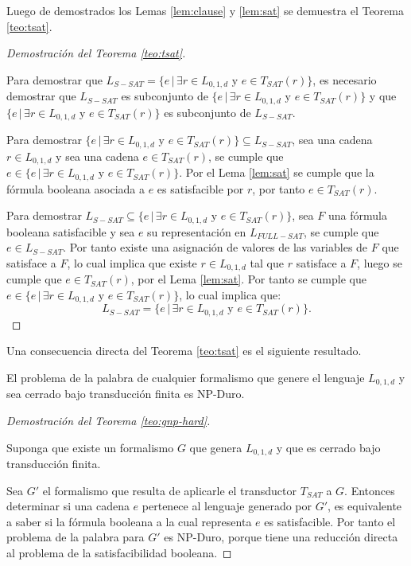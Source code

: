 Luego de demostrados los Lemas \ref{lem:clause} y \ref{lem:sat} se demuestra el Teorema \ref{teo:tsat}.

\begin{proof}[Demostración del Teorema \ref{teo:tsat}] \
    
    Para demostrar que $L_{S-SAT} = \{e\,|\,\exists r \in L_{0,1,d} \text{ y } e \in T_{SAT}(r) \}$, es necesario demostrar que 
    $L_{S-SAT}$ es subconjunto de $\{e\,|\,\exists r \in L_{0,1,d} \text{ y } e \in T_{SAT}(r) \}$ y que $\{e\,|\,\exists r \in L_{0,1,d} \text{ y } e \in T_{SAT}(r) \}$ es subconjunto de $L_{S-SAT}$.
    
    Para demostrar $\{e\,|\,\exists r \in L_{0,1,d} \text{ y } e \in T_{SAT}(r) \} \subseteq L_{S-SAT}$,
    sea una cadena $r \in L_{0,1,d}$ y sea una cadena $e\in T_{SAT}(r)$, se cumple que $e\in\{e\,|\,\exists r \in L_{0,1,d} \text{ y } e \in T_{SAT}(r) \}$. Por el Lema \ref{lem:sat} se cumple que la fórmula booleana asociada a $e$ es satisfacible por $r$, por tanto $e\in T_{SAT}(r)$. 
    
    Para demostrar $ L_{S-SAT} \subseteq \{e\,|\,\exists r \in L_{0,1,d} \text{ y } e \in T_{SAT}(r) \}$, sea $F$ una fórmula booleana satisfacible y sea $e$ su representación en $L_{FULL-SAT}$, se cumple que $e\in L_{S-SAT}$.  Por tanto existe una asignación de valores de las variables de $F$ que satisface a $F$, lo cual implica que existe $r\in L_{0,1,d}$ tal que $r$ satisface a $F$, luego se cumple que $e\in T_{SAT}(r)$, por el Lema \ref{lem:sat}.  Por tanto se cumple que $e\in \{e\,|\,\exists r \in L_{0,1,d} \text{ y } e \in T_{SAT}(r) \}$, lo cual implica que:
    $$L_{S-SAT} = \{e\,|\,\exists r \in L_{0,1,d} \text{ y } e \in T_{SAT}(r) \}.$$
\end{proof}

Una consecuencia directa del Teorema \ref{teo:tsat} es el siguiente resultado. 

\begin{theorem}
    \label{teo:gnp-hard}
    El problema de la palabra de cualquier formalismo que genere el lenguaje $L_{0,1,d}$ y sea cerrado bajo transducción finita es NP-Duro.
\end{theorem}

\begin{proof}[Demostración del Teorema \ref{teo:gnp-hard}] \
    
    Suponga que existe un formalismo $G$ que genera $L_{0,1,d}$ y que es cerrado bajo transducción finita.
    
    Sea $G'$ el formalismo que resulta de aplicarle el transductor $T_{SAT}$ a $G$. Entonces determinar si una cadena $e$ pertenece al lenguaje generado por $G'$, es equivalente a saber si la fórmula booleana a la cual representa $e$ es satisfacible. Por tanto el problema de la palabra para $G'$ es NP-Duro, porque tiene una reducción directa al problema de la satisfacibilidad booleana.
\end{proof}

